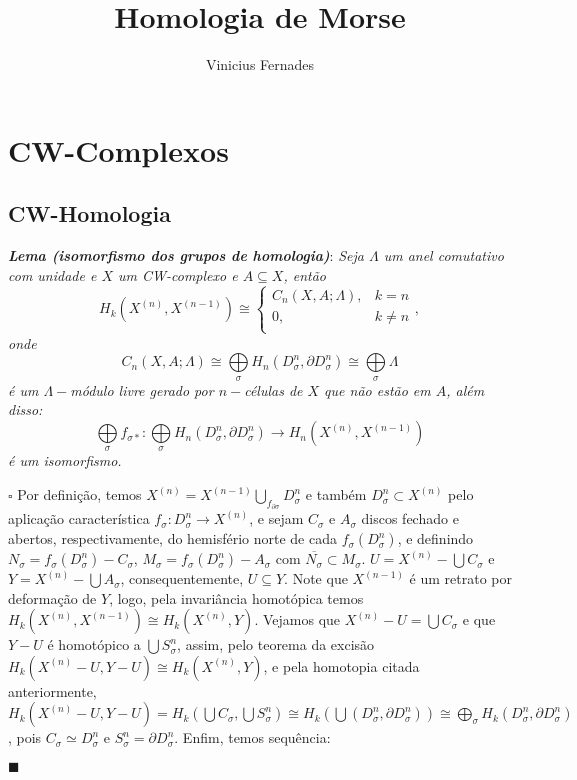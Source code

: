 \documentclass[12pt]{book}
\newcommand{\celula}[2]{D^{#1}_{#2}}
\newcommand{\celulafront}[2]{\partial D^{#1}_{#2}}
\newcommand{\skeleton}[1]{X^{(#1)}}
\newcommand{\homologia}[2]{H_{#1}(#2)}
\newcommand{\homologiarel}[3]{H_{#1}(#2,#3)}
\newcommand{\homologiarelcel}[3]{H_{#1}(D^{#2}_{#3}, \partial D^{#2}_{#3})}
\newcommand{\homologiarelskelesimpl}[2]{H_{#1}(X^{(#2)}, X^{(#2-1)})}
\newcommand{\somadir}[1]{\bigoplus \limits_{#1}}
\newcommand{\tese}[3]{\vspace{2mm} \textit{\textbf{#1}}: \textit{#2} \par $\square$ #3 \par $\blacksquare$}
\begin{document}
	
	\title{Homologia de Morse}
	
	\author{Vinicius Fernades}
	
	\maketitle
	
	\chapter{CW-Complexos}
	\section{CW-Homologia}
	\tese{Lema (isomorfismo dos grupos de homologia)}{Seja $\Lambda$ um anel comutativo com unidade e $X$ um CW-complexo e $A \subseteq X$, então 
	$$
	\homologiarelskelesimpl{k}{n} \cong 
	\left\{
		\begin{array}{cc}
		C_{n}(X, A;\Lambda) , & k = n\\
		0, & k\neq n\\
		\end{array}
	\right.,
	$$
	onde 
	$$
	C_{n}(X, A;\Lambda) \cong \somadir{\sigma} \homologiarelcel{n}{n}{\sigma} \cong \somadir{\sigma} \Lambda
	$$
	é um $\Lambda-$módulo livre gerado por $n-$células de $X$ que não estão em $A$, além disso:
	$$
	\somadir{\sigma}f_{\sigma*}: \somadir{\sigma} \homologiarelcel{n}{n}{\sigma} \to \homologiarelskelesimpl{n}{n}
	$$
	é um isomorfismo.}{Por definição, temos  $\skeleton{n} = \skeleton{n-1} \bigcup_{f_{\partial \sigma} } \celula{n}{\sigma}$ e também $\celula{n}{\sigma} \subset \skeleton{n}$ pelo aplicação característica $f_{\sigma} : \celula{n}{\sigma} \to \skeleton{n}$, e sejam $C_{\sigma}$ e $A_{\sigma}$ discos fechado e abertos, respectivamente, do hemisfério norte de cada $f_{\sigma}(\celula{n}{\sigma})$, e definindo $N_{\sigma} = f_{\sigma}(\celula{n}{\sigma}) - C_{\sigma}$, $M_{\sigma} = f_{\sigma}(\celula{n}{\sigma}) - A_{\sigma}$ com $\overline{N_{\sigma}} \subset M_{\sigma}$. $U = \skeleton{n} - \bigcup C_{\sigma}$ e $Y = \skeleton{n} - \bigcup A_{\sigma}$, consequentemente, $U \subseteq Y$. Note que $\skeleton{n-1}$ é um retrato por deformação de $Y$, logo, pela invariância homotópica temos $\homologiarel{k}{\skeleton{n}}{\skeleton{n-1}} \cong  \homologiarel{k}{\skeleton{n}}{Y}$. Vejamos que $\skeleton{n} - U = \bigcup C_{\sigma}$ e que $Y - U $ é homotópico a $\bigcup S^{n}_{\sigma}$, assim, pelo teorema da excisão $\homologiarel{k}{\skeleton{n} - U}{Y- U} \cong \homologiarel{k}{\skeleton{n}}{Y}$, e pela homotopia citada anteriormente, $\homologiarel{k}{\skeleton{n} - U}{Y- U} = \homologiarel{k}{\bigcup C_{\sigma}}{\bigcup S^{n}_{\sigma}} \cong \homologia{k}{\bigcup (\celula{n}{\sigma}, \celulafront{n}{\sigma})} \cong \somadir{\sigma} \homologiarelcel{k}{n}{\sigma}$, pois $C_{\sigma} \simeq \celula{n}{\sigma}$ e $S^{n}_{\sigma} = \celulafront{n}{\sigma}$. Enfim, temos sequência:
}
\end{document}
